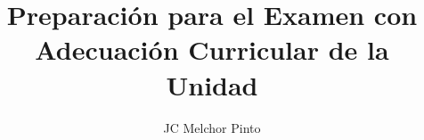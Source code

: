 \documentclass[12pt,addpoints]{repaso}
\title{Preparación para el Examen con \textbf{Adecuación Curricular} de la Unidad}
\author{JC Melchor Pinto}
\begin{document}
\INFO%
\begin{multicols}{2}
    
\end{multicols}

\begin{questions}
    
\end{questions}
\end{document}
